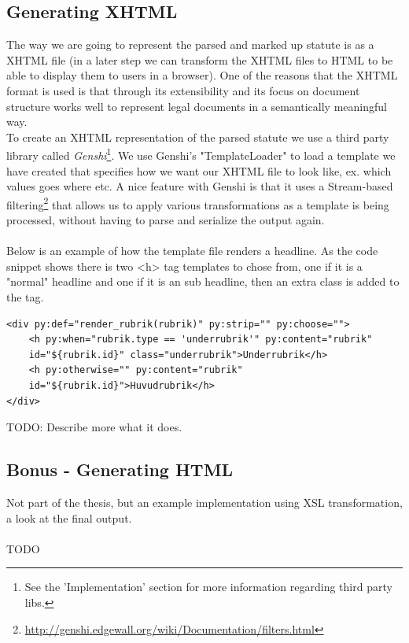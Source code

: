 \subsection{Generating XHTML}
The way we are going to represent the parsed and marked up statute is as a XHTML file (in a later step we can transform the XHTML files to HTML to be able to display them to users in a browser). One of the reasons that the XHTML format is used is that through its extensibility and its focus on document structure works well to represent legal documents in a semantically meaningful way.\\
To create an XHTML representation of the parsed statute we use a third party library called \textit{Genshi}\footnote{See the 'Implementation' section for more information regarding third party libs.}. We use Genshi's "TemplateLoader" to load a template we have created that specifies how we want our XHTML file to look like, ex. which values goes where etc. A nice feature with Genshi is that it uses a Stream-based filtering\footnote{\url{http://genshi.edgewall.org/wiki/Documentation/filters.html}} that allows us to apply various transformations as a template is being processed, without having to parse and serialize the output again.\\\\
Below is an example of how the template file renders a headline. As the code
snippet shows there is two <h> tag templates to chose from, one if it is a "normal" headline and one if it is an sub headline, then an extra class is added to the tag.\\
\begin{verbatim}
<div py:def="render_rubrik(rubrik)" py:strip="" py:choose="">
    <h py:when="rubrik.type == 'underrubrik'" py:content="rubrik"
	id="${rubrik.id}" class="underrubrik">Underrubrik</h>
    <h py:otherwise="" py:content="rubrik"
	id="${rubrik.id}">Huvudrubrik</h>
</div>
\end{verbatim}
\linebreak  
\newline
TODO: Describe more what it does.\\
\subsection{Bonus - Generating HTML}
Not part of the thesis, but an example implementation using XSL transformation, a look at the final output.\\\\
TODO 

